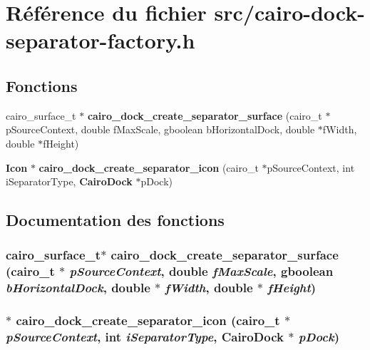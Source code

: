 \section{Référence du fichier src/cairo-dock-separator-factory.h}
\label{cairo-dock-separator-factory_8h}
\subsection*{Fonctions}
\begin{CompactItemize}
\item 
cairo\_\-surface\_\-t $\ast$ {\bf cairo\_\-dock\_\-create\_\-separator\_\-surface} (cairo\_\-t $\ast$pSourceContext, double fMaxScale, gboolean bHorizontalDock, double $\ast$fWidth, double $\ast$fHeight)
\item 
{\bf Icon} $\ast$ {\bf cairo\_\-dock\_\-create\_\-separator\_\-icon} (cairo\_\-t $\ast$pSourceContext, int iSeparatorType, {\bf CairoDock} $\ast$pDock)
\end{CompactItemize}


\subsection{Documentation des fonctions}
\subsubsection{\setlength{\rightskip}{0pt plus 5cm}cairo\_\-surface\_\-t$\ast$ cairo\_\-dock\_\-create\_\-separator\_\-surface (cairo\_\-t $\ast$ {\em pSourceContext}, double {\em fMaxScale}, gboolean {\em bHorizontalDock}, double $\ast$ {\em fWidth}, double $\ast$ {\em fHeight})}\label{cairo-dock-separator-factory_8h_a62ef285e32a79de3efc5be781079ab4}


\subsubsection{$\ast$ cairo\_\-dock\_\-create\_\-separator\_\-icon (cairo\_\-t $\ast$ {\em pSourceContext}, int {\em iSeparatorType}, {\bf CairoDock} $\ast$ {\em pDock})}\label{cairo-dock-separator-factory_8h_3fd6483ad1688ab96a758fa4aef9905a}


